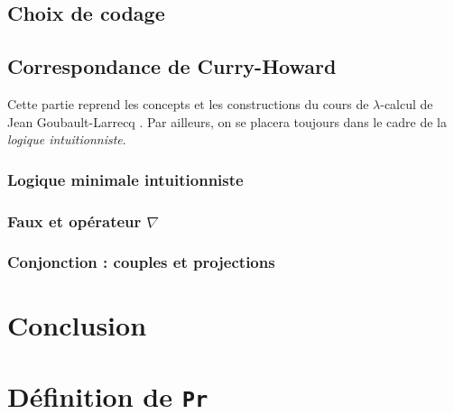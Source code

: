 \documentclass[a4paper]{article}
\theoremstyle{remark}
\theoremstyle{remark}
\theoremstyle{remark}
\theoremstyle{definition}
\theoremstyle{definition}
\theoremstyle{definition}
\begin{document}
\subsection{Choix de codage}

\subsection{Correspondance de {\sc Curry-Howard}}

Cette partie reprend les concepts et les constructions du cours de $\lambda$-calcul de Jean Goubault-Larrecq \cite{polylam}. Par ailleurs, on se placera toujours dans le cadre de la \emph{logique intuitionniste}.

\subsubsection{Logique minimale intuitionniste}

\subsubsection{Faux et opérateur $\nabla$}

\subsubsection{Conjonction : couples et projections}


\section{Conclusion}


\nocite{*}


\appendix
\newpage

\section{Définition de \texttt{Pr}} \label{pr}
\end{document}
